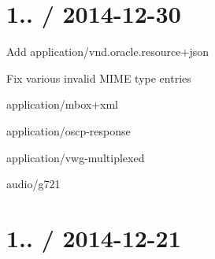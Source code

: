 \section*{1.. / 2014-\/12-\/30 }


\begin{DoxyItemize}
\item Add {\ttfamily application/vnd.\+oracle.\+resource+json}
\item Fix various invalid M\+I\+M\+E type entries
\begin{DoxyItemize}
\item {\ttfamily application/mbox+xml}
\item {\ttfamily application/oscp-\/response}
\item {\ttfamily application/vwg-\/multiplexed}
\item {\ttfamily audio/g721}
\end{DoxyItemize}
\end{DoxyItemize}

\section*{1.. / 2014-\/12-\/21 }


